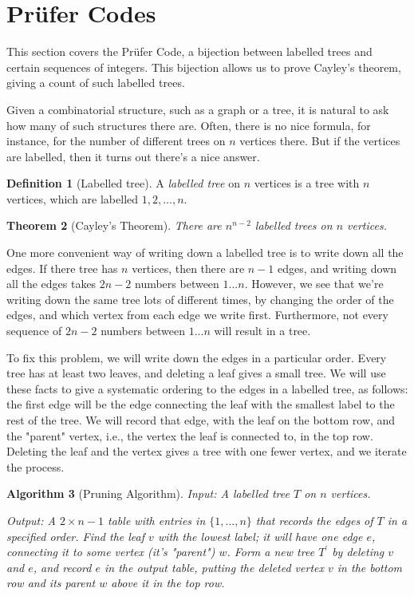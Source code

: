 \documentclass[10pt,]{book}
\theoremstyle{plain}
\newtheorem{theorem}{Theorem}[section]
\newtheorem{algorithm}[theorem]{Algorithm}
\theoremstyle{definition}
\newtheorem{definition}[theorem]{Definition}
\theoremstyle{definition}
\theoremstyle{definition}
\theoremstyle{definition}
\numberwithin{equation}{section}
\begin{document}
\section[{Prüfer Codes}]{Prüfer Codes}\label{s_graphalgorithms_prufer}
\hypertarget{p-224}{}%
This section covers the Prüfer Code, a bijection between labelled trees and certain sequences of integers. This bijection allows us to prove Cayley's theorem, giving a count of such labelled trees.%
\par
\hypertarget{p-225}{}%
Given a combinatorial structure, such as a graph or a tree, it is natural to ask how many of such structures there are.  Often, there is no nice formula, for instance, for the number of different trees on \(n\) vertices there.  But if the vertices are labelled, then it turns out there's a nice answer.%
\begin{definition}[{Labelled tree}]\label{definition-18}
\hypertarget{p-226}{}%
A \emph{labelled tree} on \(n\) vertices is a tree with \(n\) vertices, which are labelled \(1,2,\dots,n.\)%
\end{definition}
\begin{theorem}[{Cayley's Theorem}]\label{theorem-5}
\hypertarget{p-227}{}%
There are \(n^{n-2}\) labelled trees on \(n\) vertices.%
\end{theorem}
\hypertarget{p-228}{}%
One more convenient way of writing down a labelled tree is to write down all the edges.  If there tree has \(n\) vertices, then there are \(n-1\) edges, and writing down all the edges takes \(2n-2\) numbers between \(1...n\).  However, we see that we're writing down the same tree lots of different times, by changing the order of the edges, and which vertex from each edge we write first.  Furthermore, not every sequence of \(2n-2\) numbers between \(1...n\) will result in a tree.%
\par
\hypertarget{p-229}{}%
To fix this problem, we will write down the edges in a particular order.  Every tree has at least two leaves, and deleting a leaf gives a small tree.  We will use these facts to give a systematic ordering to the edges in a labelled tree, as follows: the first edge will be the edge connecting the leaf with the smallest label to the rest of the tree.  We will record that edge, with the leaf on the bottom row, and the "parent" vertex, i.e., the vertex the leaf is connected to, in the top row.  Deleting the leaf and the vertex gives a tree with one fewer vertex, and we iterate the process.%
\begin{algorithm}[{Pruning Algorithm}]\label{algorithm-4}
\hypertarget{p-230}{}%
Input:  A labelled tree \(T\) on \(n\) vertices.%
\par
\hypertarget{p-231}{}%
Output: A \(2\times n-1\) table with entries in \(\{1,\dots,n\}\) that records the edges of \(T\) in a specified order.%
\hypertarget{p-232}{}%
Find the leaf \(v\) with the lowest label; it will have one edge \(e\), connecting it to some vertex (it's "parent") \(w\).   Form a new tree \(T^\prime\) by deleting \(v\) and \(e\), and record \(e\) in the output table, putting the deleted vertex \(v\) in the bottom row and its parent \(w\) above it in the top row.%
\end{algorithm}
\end{document}
